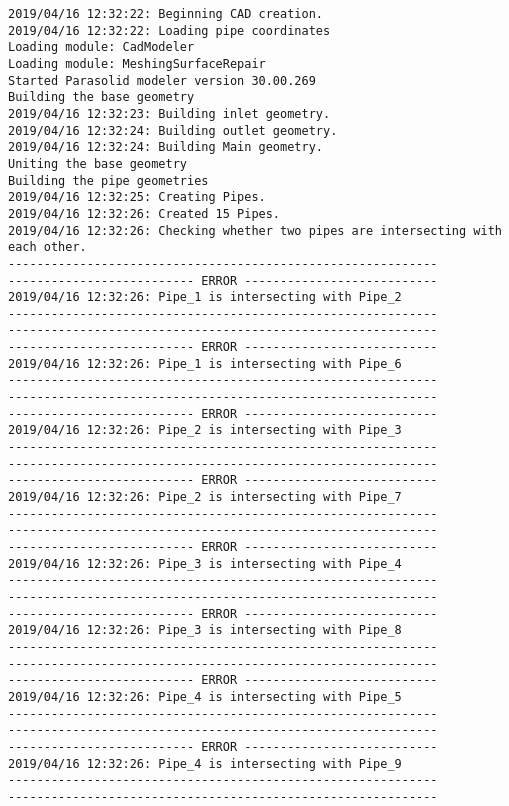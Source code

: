 \documentclass{article}
\begin{document}
{\tiny 
\begin{verbatim}
2019/04/16 12:32:22: Beginning CAD creation.
2019/04/16 12:32:22: Loading pipe coordinates
Loading module: CadModeler
Loading module: MeshingSurfaceRepair
Started Parasolid modeler version 30.00.269
Building the base geometry
2019/04/16 12:32:23: Building inlet geometry.
2019/04/16 12:32:24: Building outlet geometry.
2019/04/16 12:32:24: Building Main geometry.
Uniting the base geometry
Building the pipe geometries
2019/04/16 12:32:25: Creating Pipes.
2019/04/16 12:32:26: Created 15 Pipes.
2019/04/16 12:32:26: Checking whether two pipes are intersecting with each other.
------------------------------------------------------------
-------------------------- ERROR ---------------------------
2019/04/16 12:32:26: Pipe_1 is intersecting with Pipe_2
------------------------------------------------------------
------------------------------------------------------------
-------------------------- ERROR ---------------------------
2019/04/16 12:32:26: Pipe_1 is intersecting with Pipe_6
------------------------------------------------------------
------------------------------------------------------------
-------------------------- ERROR ---------------------------
2019/04/16 12:32:26: Pipe_2 is intersecting with Pipe_3
------------------------------------------------------------
------------------------------------------------------------
-------------------------- ERROR ---------------------------
2019/04/16 12:32:26: Pipe_2 is intersecting with Pipe_7
------------------------------------------------------------
------------------------------------------------------------
-------------------------- ERROR ---------------------------
2019/04/16 12:32:26: Pipe_3 is intersecting with Pipe_4
------------------------------------------------------------
------------------------------------------------------------
-------------------------- ERROR ---------------------------
2019/04/16 12:32:26: Pipe_3 is intersecting with Pipe_8
------------------------------------------------------------
------------------------------------------------------------
-------------------------- ERROR ---------------------------
2019/04/16 12:32:26: Pipe_4 is intersecting with Pipe_5
------------------------------------------------------------
------------------------------------------------------------
-------------------------- ERROR ---------------------------
2019/04/16 12:32:26: Pipe_4 is intersecting with Pipe_9
------------------------------------------------------------
------------------------------------------------------------

\end{verbatim}}
\end{document}
